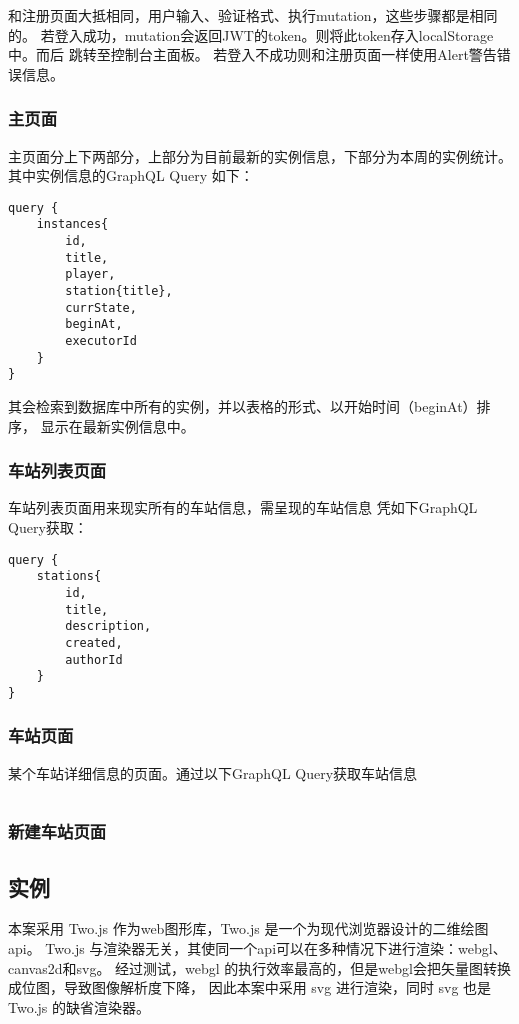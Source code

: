 和注册页面大抵相同，用户输入、验证格式、执行mutation，这些步骤都是相同的。
若登入成功，mutation会返回JWT的token。则将此token存入localStorage中。而后
跳转至控制台主面板。
若登入不成功则和注册页面一样使用Alert警告错误信息。

\subsubsection{主页面}
主页面分上下两部分，上部分为目前最新的实例信息，下部分为本周的实例统计。
其中实例信息的GraphQL Query 如下：

\begin{lstlisting}
query {
    instances{
        id,
        title,
        player,
        station{title},
        currState,
        beginAt,
        executorId
    }
}
\end{lstlisting}

其会检索到数据库中所有的实例，并以表格的形式、以开始时间（beginAt）排序，
显示在最新实例信息中。

\subsubsection{车站列表页面}
车站列表页面用来现实所有的车站信息，需呈现的车站信息
凭如下GraphQL Query获取：
\begin{lstlisting}
query {
    stations{
        id,
        title,
        description,
        created,
        authorId
    }
}
\end{lstlisting}

\subsubsection{车站页面}
某个车站详细信息的页面。通过以下GraphQL Query获取车站信息
\begin{lstlisting}
\end{lstlisting}

\subsubsection{新建车站页面}


\subsection{实例}
本案采用 Two.js 作为web图形库，Two.js 是一个为现代浏览器设计的二维绘图api。
Two.js 与渲染器无关，其使同一个api可以在多种情况下进行渲染：webgl、canvas2d和svg。
经过测试，webgl 的执行效率最高的，但是webgl会把矢量图转换成位图，导致图像解析度下降，
因此本案中采用 svg 进行渲染，同时 svg 也是 Two.js 的缺省渲染器。

